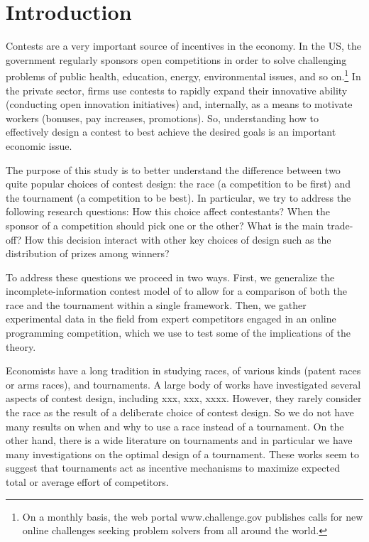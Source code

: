 \section{Introduction}\label{introduction}

Contests are a very important source of incentives in the economy. In
the US, the government regularly sponsors open competitions in order to
solve challenging problems of public health, education, energy,
environmental issues, and so on.\footnote{On a monthly basis, the web
  portal www.challenge.gov publishes calls for new online challenges
  seeking problem solvers from all around the world.} In the private
sector, firms use contests to rapidly expand their innovative ability
(conducting open innovation initiatives) and, internally, as a means to
motivate workers (bonuses, pay increases, promotions). So, understanding
how to effectively design a contest to best achieve the desired goals is
an important economic issue.

The purpose of this study is to better understand the difference between
two quite popular choices of contest design: the race (a competition to
be first) and the tournament (a competition to be best). In particular,
we try to address the following research questions: How this choice
affect contestants? When the sponsor of a competition should pick one or
the other? What is the main trade-off? How this decision interact with
other key choices of design such as the distribution of prizes among
winners?

To address these questions we proceed in two ways. First, we generalize
the incomplete-information contest model of \citet{moldovanu2001optimal}
to allow for a comparison of both the race and the tournament within a
single framework. Then, we gather experimental data in the field from
expert competitors engaged in an online programming competition, which
we use to test some of the implications of the theory.

Economists have a long tradition in studying races, of various kinds
(patent races or arms races), and tournaments. A large body of works
have investigated several aspects of contest design, including xxx, xxx,
xxxx. However, they rarely consider the race as the result of a
deliberate choice of contest design. So we do not have many results on
when and why to use a race instead of a tournament. On the other hand,
there is a wide literature on tournaments and in particular we have many
investigations on the optimal design of a tournament. These works seem
to suggest that tournaments act as incentive mechanisms to maximize
expected total or average effort of competitors.


